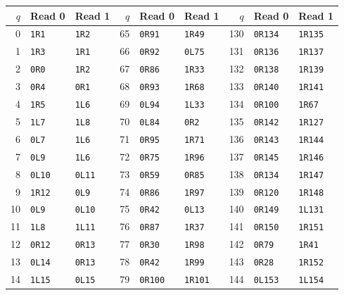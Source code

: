 \begingroup\small\setlength{\tabcolsep}{7pt}
\begin{longtable}{@{}rll@{\hspace{20pt}}rll@{\hspace{20pt}}rll@{}}
\toprule
$q$ & Read 0 & Read 1 & $q$ & Read 0 & Read 1 & $q$ & Read 0 & Read 1\\
\midrule\endhead
0 & \texttt{1R1} & \texttt{1R2} & 65 & \texttt{0R91} & \texttt{1R49} & 130 & \texttt{0R134} & \texttt{1R135}\\
1 & \texttt{1R3} & \texttt{1R1} & 66 & \texttt{0R92} & \texttt{0L75} & 131 & \texttt{0R136} & \texttt{1R137}\\
2 & \texttt{0R0} & \texttt{1R2} & 67 & \texttt{0R86} & \texttt{1R33} & 132 & \texttt{0R138} & \texttt{1R139}\\
3 & \texttt{0R4} & \texttt{0R1} & 68 & \texttt{0R93} & \texttt{1R68} & 133 & \texttt{0R140} & \texttt{1R141}\\
4 & \texttt{1R5} & \texttt{1L6} & 69 & \texttt{0L94} & \texttt{1L33} & 134 & \texttt{0R100} & \texttt{1R67}\\
5 & \texttt{1L7} & \texttt{1L8} & 70 & \texttt{0L84} & \texttt{0R2} & 135 & \texttt{0R142} & \texttt{1R127}\\
6 & \texttt{0L7} & \texttt{1L6} & 71 & \texttt{0R95} & \texttt{1R71} & 136 & \texttt{0R143} & \texttt{1R144}\\
7 & \texttt{0L9} & \texttt{1L6} & 72 & \texttt{0R75} & \texttt{1R96} & 137 & \texttt{0R145} & \texttt{1R146}\\
8 & \texttt{0L10} & \texttt{0L11} & 73 & \texttt{0R59} & \texttt{0R85} & 138 & \texttt{0R134} & \texttt{1R147}\\
9 & \texttt{1R12} & \texttt{0L9} & 74 & \texttt{0R86} & \texttt{1R97} & 139 & \texttt{0R120} & \texttt{1R148}\\
10 & \texttt{0L9} & \texttt{0L10} & 75 & \texttt{0R42} & \texttt{0L13} & 140 & \texttt{0R149} & \texttt{1L131}\\
11 & \texttt{1L8} & \texttt{1L11} & 76 & \texttt{0R87} & \texttt{1R37} & 141 & \texttt{0R150} & \texttt{1R151}\\
12 & \texttt{0R12} & \texttt{0R13} & 77 & \texttt{0R30} & \texttt{1R98} & 142 & \texttt{0R79} & \texttt{1R41}\\
13 & \texttt{0L14} & \texttt{0R13} & 78 & \texttt{0R42} & \texttt{1R99} & 143 & \texttt{0R28} & \texttt{1R152}\\
14 & \texttt{1L15} & \texttt{0L15} & 79 & \texttt{0R100} & \texttt{1R101} & 144 & \texttt{0L153} & \texttt{1L154}\\

\end{longtable}
